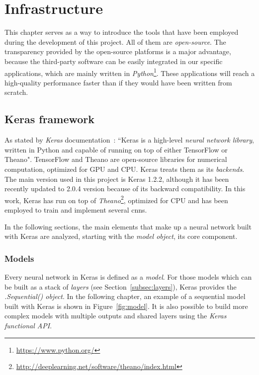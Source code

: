 \chapter{Infrastructure}\label{ch:infrastructure}
This chapter serves as a way to introduce the tools that have been employed during the development of this project. All of them are \emph{open-source}. The transparency provided by the open-source platforms is a major advantage, because the third-party software can be easily integrated in our specific applications, which are mainly written in \emph{Python}\footnote{\url{https://www.python.org/}}. These applications will reach a high-quality performance faster than if they would have been written from scratch.

\section{Keras framework}\label{sec:keras}
As stated by \emph{Keras} documentation~\cite{chollet2015keras}: ``Keras is a high-level \emph{neural network library}, written in Python and capable of running on top of either TensorFlow or Theano". TensorFlow and Theano are open-source libraries for numerical computation, optimized for GPU and CPU. Keras treats them as its \textit{backends}. The main version used in this project is Keras 1.2.2, although it has been recently updated to 2.0.4 version because of its backward compatibility. In this work, Keras has run on top of \emph{Theano}\footnote{\url{http://deeplearning.net/software/theano/index.html}}, optimized for CPU and has been employed to train and implement several \glspl{cnn}.

In the following sections, the main elements that make up a neural network built with Keras are analyzed, starting with the \emph{\textit{model} object}, its core component.

\subsection{Models}\label{subsec:models}
Every neural network in Keras is defined as a \emph{\textit{model}}. For those models which can be built as a stack of \textit{layers} (see Section~\ref{subsec:layers}), Keras provides the \emph{\textit{.Sequential()} object}. In the following chapter, an example of a sequential model built with Keras is shown in Figure~\ref{fig:model}. It is also possible to build more complex models with multiple outputs and shared layers using the \emph{Keras functional API}.

